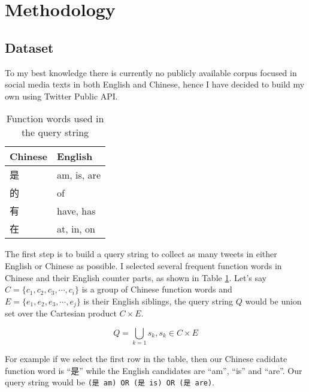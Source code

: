 \documentclass[11pt,a4paper]{article}
\begin{document}
\section{Methodology}

\subsection{Dataset}

To my best knowledge there is currently no publicly available corpus focused in social media texts in both English and Chinese, hence I have decided to build my own using Twitter Public API.

\begin{CJK*}{UTF8}{gbsn}

\begin{table}[t]
  \begin{center}
  \begin{tabular}{|l|l|}
  \hline \bf Chinese & \bf English \\ \hline
  是 & am, is, are \\
  的 & of \\
  有 & have, has \\
  在 & at, in, on \\
  \hline
  \end{tabular}
  \end{center}
  \caption{\label{tab:query-func-words-table} Function words used in the query string}
\end{table}

The first step is to build a query string to collect as many tweets in either English or Chinese as possible. I selected several frequent function words in Chinese and their English counter parts, as shown in Table \ref{tab:query-func-words-table}.  Let's say $C=\{c_1, c_2, c_3, \cdots, c_i\}$ is a group of Chinese function words and $E=\{e_1, e_2, e_3, \cdots, e_j\}$ is their English siblings, the query string $Q$ would be union set over the Cartesian product $C\times E$.

\begin{equation}
  Q=\bigcup_{k=1}s_k, s_k \in C \times E
\end{equation}

For example if we select the first row in the table, then our Chinese cadidate function word is ``是'' while the English candidates are ``am'', ``is'' and ``are''. Our query string would be \verb|(是 am) OR (是 is) OR (是 are)|.

\end{CJK*}
\end{document}
